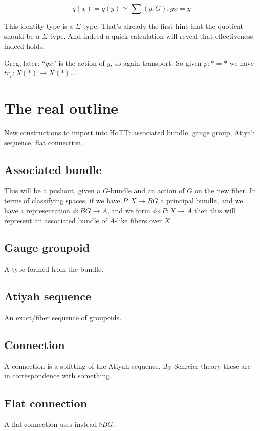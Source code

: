 \documentclass[12pt]{article}
\begin{document}
$$q(x)=q(y) \simeq \sum (g:G), gx=y$$

This identity type is a $\Sigma$-type. That's already the first hint that the quotient should be a $\Sigma$-type. And indeed a quick calculation will reveal that effectiveness indeed holds.

Greg, later: ``$gx$'' is the action of $g$, so again transport. So given $p:*=*$ we have $tr_p:X(*) \to X(*)$...

\section{The real outline}
New constructions to import into HoTT: associated bundle, gauge group, Atiyah sequence, flat connection.
\subsection{Associated bundle}
This will be a pushout, given a $G$-bundle and an action of $G$ on the new fiber. In terms of classifying spaces, if we have $P: X \to BG$ a principal bundle, and we have a representation $\phi:BG\to A$, and we form $\phi\circ P:X \to A$ then this will represent an associated bundle of $A$-like fibers over $X$.
\subsection{Gauge groupoid}
A type formed from the bundle.
\subsection{Atiyah sequence}
An exact/fiber sequence of groupoids.
\subsection{Connection}
A connection is a splitting of the Atiyah sequence. By Schreier theory these are in correspondence with something.
\subsection{Flat connection}
A flat connection uses instead $\flat BG$.



\end{document}
